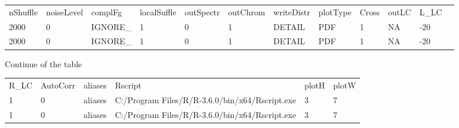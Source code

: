 \documentclass{article}
\newcommand{\tw}{\textwidth}
\begin{document}
\begin{flushright}
\begin{minipage}{0.9\tw}
\begin{shaded} 
\begin{scriptsize}
\begin{tabular}{llllllllllll}
 nShuffle & noiseLevel & complFg & localSuffle & outSpectr & outChrom & writeDistr & plotType & Cross & outLC & L\_LC \\
 2000     & 0          & IGNORE\_ & 1           & 0         & 1        & DETAIL     & PDF     & 1     & NA    & -20   \\
 2000     & 0          & IGNORE\_ & 1           & 0         & 1        & DETAIL     & PDF     & 1     & NA    & -20   \\
\end{tabular}
\end{scriptsize}
\end{shaded}
\end{minipage} 
\end{flushright}

Continue of the table

\begin{flushright}
\begin{minipage}{0.7\tw}
\begin{shaded} 
\begin{scriptsize}
\begin{tabular}{llllll}
 R\_LC &AutoCorr & aliases & Rscript                                        & plotH &plotW\\
 1     &0        & aliases & C:/Program Files/R/R-3.6.0/bin/x64/Rscript.exe & 3     & 7   \\ 
 1     &0        & aliases & C:/Program Files/R/R-3.6.0/bin/x64/Rscript.exe & 3     & 7   \\
\end{tabular}
\end{scriptsize}
\end{shaded}
\end{minipage} 

\end{flushright}
\end{document}

